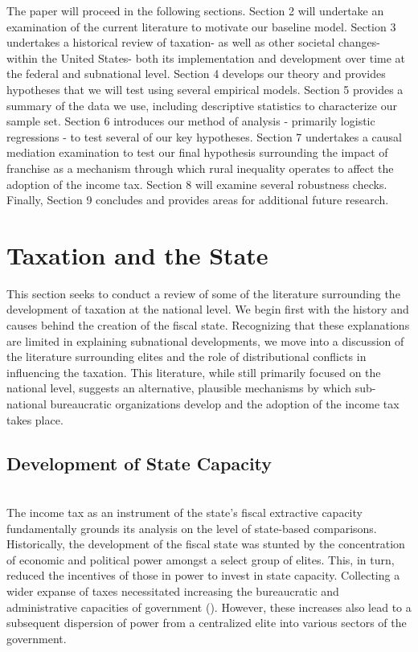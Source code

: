 \documentclass[letter, 12pt]{article}
\begin{document}
The paper will proceed in the following sections. Section 2 will undertake an examination of the current literature to motivate our baseline model. Section 3 undertakes a historical review of taxation- as well as other societal changes- within the United States- both its implementation and development over time at the federal and subnational level. Section 4 develops our theory and provides hypotheses that we will test using several empirical models. Section 5 provides a summary of the data we use, including descriptive statistics to characterize our sample set. Section 6 introduces our method of analysis - primarily logistic regressions - to test several of our key hypotheses. Section 7 undertakes a causal mediation examination to test our final hypothesis surrounding the impact of franchise as a mechanism through which rural inequality operates to affect the adoption of the income tax.  Section 8 will examine several robustness checks. Finally, Section 9 concludes and provides areas for additional future research.


\section{Taxation and the State}

This section seeks to conduct a review of some of the literature surrounding the development of taxation at the national level. We begin first with the history and causes behind the creation of the fiscal state. Recognizing that these explanations are limited in explaining subnational developments, we move into a discussion of the literature surrounding elites and the role of distributional conflicts in influencing the taxation. This literature, while still primarily focused on the national level, suggests an alternative, plausible mechanisms by which sub-national bureaucratic organizations develop and the adoption of the income tax takes place.

\subsection{Development of State Capacity}\hfill\\

The income tax as an instrument of the state's fiscal extractive capacity fundamentally grounds its analysis on the level of state-based comparisons. Historically, the development of the fiscal state was stunted by the concentration of economic and political power amongst a select group of elites. This, in turn, reduced the incentives of those in power to invest in state capacity. Collecting a wider expanse of taxes necessitated increasing the bureaucratic and administrative capacities of government (\citealt{cardenas2010state}). However, these increases also lead to a subsequent dispersion of power from a centralized elite into various sectors of the government.
\end{document}

